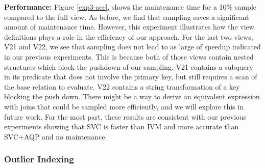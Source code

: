 \textbf{Performance: }
Figure \ref{exp3-acc}, shows the maintenance time for a 10\% sample compared to the full view.
As before, we find that sampling saves a significant amount of maintenance time.
However, this experiment illustrates how the view definitions plays a role in the efficiency of our approach.
For the last two views, V21 and V22, we see that sampling does not lead to as large of speedup indicated in our previous experiments.  
This is because both of those views contain nested structures which block the pushdown of our sampling.
V21 contains a subquery in its predicate that does not involve the primary key, but still requires a scan of the base relation to evaluate.
V22 contains a string transformation of a key blocking the push down.
There might be a way to derive an equivalent expression with joins that could be sampled more efficiently, and we will explore this in future work.
For the most part, these results are consistent with our previous experiments showing that SVC is faster than IVM and more accurate than SVC+AQP and no maintenance.


\subsubsection{Outlier Indexing}

